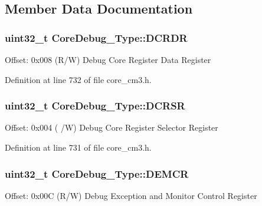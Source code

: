 \subsection{\-Member \-Data \-Documentation}
\hypertarget{struct_core_debug___type_ab8f4bb076402b61f7be6308075a789c9}{
\subsubsection[{\-D\-C\-R\-D\-R}]{ uint32\-\_\-t {\bf \-Core\-Debug\-\_\-\-Type\-::\-D\-C\-R\-D\-R}}}\label{struct_core_debug___type_ab8f4bb076402b61f7be6308075a789c9}
\-Offset\-: 0x008 (\-R/\-W) \-Debug \-Core \-Register \-Data \-Register 

\-Definition at line 732 of file core\-\_\-cm3.\-h.

\hypertarget{struct_core_debug___type_afefa84bce7497652353a1b76d405d983}{
\subsubsection[{\-D\-C\-R\-S\-R}]{ uint32\-\_\-t {\bf \-Core\-Debug\-\_\-\-Type\-::\-D\-C\-R\-S\-R}}}\label{struct_core_debug___type_afefa84bce7497652353a1b76d405d983}
\-Offset\-: 0x004 ( /\-W) \-Debug \-Core \-Register \-Selector \-Register 

\-Definition at line 731 of file core\-\_\-cm3.\-h.

\hypertarget{struct_core_debug___type_a5cdd51dbe3ebb7041880714430edd52d}{
\subsubsection[{\-D\-E\-M\-C\-R}]{ uint32\-\_\-t {\bf \-Core\-Debug\-\_\-\-Type\-::\-D\-E\-M\-C\-R}}}\label{struct_core_debug___type_a5cdd51dbe3ebb7041880714430edd52d}
\-Offset\-: 0x00\-C (\-R/\-W) \-Debug \-Exception and \-Monitor \-Control \-Register 

